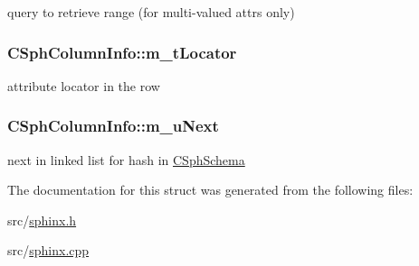 query to retrieve range (for multi-\/valued attrs only) 

\hypertarget{structCSphColumnInfo_add79fe460a5cecd6360fd1e2c7c15479}{
\subsubsection[{m\-\_\-t\-Locator}]{ C\-Sph\-Column\-Info\-::m\-\_\-t\-Locator}}\label{structCSphColumnInfo_add79fe460a5cecd6360fd1e2c7c15479}


attribute locator in the row 

\hypertarget{structCSphColumnInfo_af8e24ae07a148ef5edba4a34574d4223}{
\subsubsection[{m\-\_\-u\-Next}]{ C\-Sph\-Column\-Info\-::m\-\_\-u\-Next}}\label{structCSphColumnInfo_af8e24ae07a148ef5edba4a34574d4223}


next in linked list for hash in \hyperlink{classCSphSchema}{C\-Sph\-Schema} 



The documentation for this struct was generated from the following files\-:\begin{DoxyCompactItemize}
\item 
src/\hyperlink{sphinx_8h}{sphinx.\-h}\item 
src/\hyperlink{sphinx_8cpp}{sphinx.\-cpp}\end{DoxyCompactItemize}
